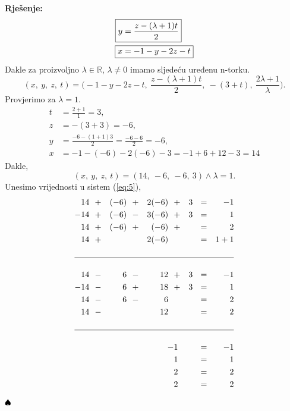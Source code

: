 \documentclass{article}
\newenvironment{solution}{\noindent\textbf{Rje\v senje:\newline}}{$\hfill\spadesuit$}
\begin{document}
\begin{solution}
\begin{equation*}
\begin{aligned}
                    \Aboxed{y&=\frac{z-(\lambda +1)t}{2}} \\
                    \Aboxed{x&=-1-y-2z-t} \\
        \end{aligned}
    \end{equation*}
    Dakle za proizvoljno $\lambda\in\mathbb{R}$, $\lambda\neq 0$ imamo sljede\' cu uređenu n-torku.
    $$(x,\ y,\ z,\ t)=\biggl(-1-y-2z-t,\ \frac{z-(\lambda +1)t}{2},\ -(3+t),\ \frac{2\lambda +1}{\lambda}\biggr).$$
    Provjerimo za $\lambda =1$. \\
    \begin{equation*}
        \begin{aligned}
            \boxed{t}&=\frac{2+1}{1}=\boxed{3}, \\
            \boxed{z}&=-(3+3)=\boxed{-6}, \\
            \boxed{y}&=\frac{-6-(1+1)3}{2}=\frac{-6-6}{2}=\boxed{-6}, \\
            \boxed{x}&=-1-(-6)-2(-6)-3=-1+6+12-3=\boxed{14}
        \end{aligned}
    \end{equation*}
    Dakle,
    $$(x,\ y,\ z,\ t)=(14,\ -6,\ -6,\ 3)\land\lambda =1.$$
    Unesimo vrijednosti u sistem (\ref{eq:5}),
    \begin{equation*}
        \begin{aligned}
            14\ \ &+&(-6)\ \ &+&2(-6)\ \ &+&3&\ \ =&-1 \\
            -14\ \ &+&(-6)\ \ &-&3(-6)\ \ &+&3&\ \ =&1 \\
             14\ \ &+&(-6)\ \ &+& (-6)\ \ &+& &\ \ =&2 \\
             14\ \ &+& \ \ & &2(-6)\ \ & & &\ \ =&1+1 \\\\
             \hline\\
             14\ \ &-&6\ \ &-&12\ \ &+&3&\ \ =&-1 \\
            -14\ \ &-&6\ \ &+&18\ \ &+&3&\ \ =&1 \\
             14\ \ &-&6\ \ &-&6\ \ && &\ \ =&2 \\
             14\ \ &-& \ \ & &12\ \ & & &\ \ =&2 \\\\
             \hline\\
             \ \ & & \ \ & & \ \ -&1& &\ \ =&-1 \\
             \ \ & & \ \ & & \ \ &1& &\ \ =&1 \\
             \ \ & & \ \ & & \ \ &2& &\ \ =&2 \\
             \ \ & & \ \ & & \ \ &2& &\ \ =&2 \\
            \end{aligned}
        \end{equation*}
        
\end{solution}
\end{document}
